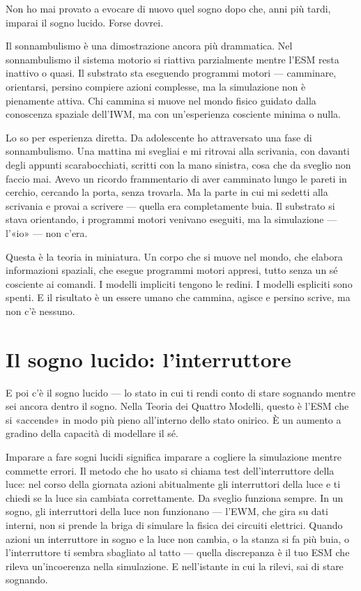 \documentclass[11pt, twoside, openright]{book}
\begin{document}
Non ho mai provato a evocare di nuovo quel sogno dopo che, anni più tardi, imparai il sogno lucido. Forse dovrei.

Il sonnambulismo è una dimostrazione ancora più drammatica. Nel sonnambulismo il sistema motorio si riattiva parzialmente mentre l'ESM resta inattivo o quasi. Il substrato sta eseguendo programmi motori --- camminare, orientarsi, persino compiere azioni complesse, ma la simulazione non è pienamente attiva. Chi cammina si muove nel mondo fisico guidato dalla conoscenza spaziale dell'IWM, ma con un'esperienza cosciente minima o nulla.

Lo so per esperienza diretta. Da adolescente ho attraversato una fase di sonnambulismo. Una mattina mi svegliai e mi ritrovai alla scrivania, con davanti degli appunti scarabocchiati, scritti con la mano sinistra, cosa che da sveglio non faccio mai. Avevo un ricordo frammentario di aver camminato lungo le pareti in cerchio, cercando la porta, senza trovarla. Ma la parte in cui mi sedetti alla scrivania e provai a scrivere --- quella era completamente buia. Il substrato si stava orientando, i programmi motori venivano eseguiti, ma la simulazione --- l'«io» --- non c'era.

Questa è la teoria in miniatura. Un corpo che si muove nel mondo, che elabora informazioni spaziali, che esegue programmi motori appresi, tutto senza un sé cosciente ai comandi. I modelli impliciti tengono le redini. I modelli espliciti sono spenti. E il risultato è un essere umano che cammina, agisce e persino scrive, ma non c'è nessuno.

\section*{Il sogno lucido: l'interruttore}

E poi c'è il sogno lucido --- lo stato in cui ti rendi conto di stare sognando mentre sei ancora dentro il sogno. Nella Teoria dei Quattro Modelli, questo è l'ESM che si «accende» in modo più pieno all'interno dello stato onirico. È un aumento a gradino della capacità di modellare il sé.

Imparare a fare sogni lucidi significa imparare a cogliere la simulazione mentre commette errori. Il metodo che ho usato si chiama test dell'interruttore della luce: nel corso della giornata azioni abitualmente gli interruttori della luce e ti chiedi se la luce sia cambiata correttamente. Da sveglio funziona sempre. In un sogno, gli interruttori della luce non funzionano --- l'EWM, che gira su dati interni, non si prende la briga di simulare la fisica dei circuiti elettrici. Quando azioni un interruttore in sogno e la luce non cambia, o la stanza si fa più buia, o l'interruttore ti sembra sbagliato al tatto --- quella discrepanza è il tuo ESM che rileva un'incoerenza nella simulazione. E nell'istante in cui la rilevi, sai di stare sognando.
\end{document}
